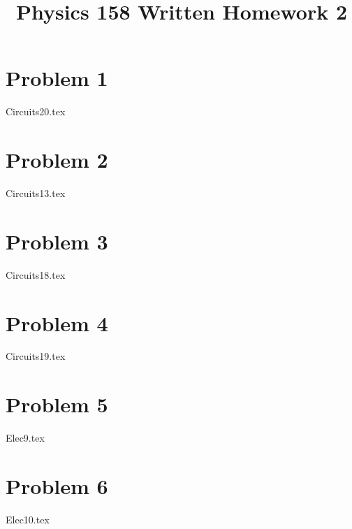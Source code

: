 \documentclass[11pt, fleqn]{article}
\title{Physics 158 Written Homework 2}
\author{}
\date{}
\begin{document}
\allowdisplaybreaks

\maketitle

\section*{Problem 1}
{Circuits20.tex}
\section*{Problem 2}
{Circuits13.tex}
\section*{Problem 3}
{Circuits18.tex}
\section*{Problem 4}
{Circuits19.tex}
\section*{Problem 5}
{Elec9.tex}
\section*{Problem 6}
{Elec10.tex}
\end{document}
